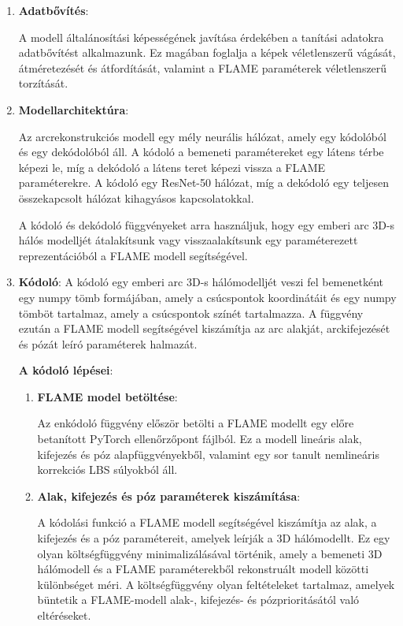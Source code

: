 \documentclass[12pt,a4]{article}
\begin{document}
    \begin{enumerate}
        \item \textbf{Adatbővítés}:
        
        A modell általánosítási képességének javítása érdekében a tanítási adatokra adatbővítést alkalmazunk. Ez magában foglalja a képek véletlenszerű vágását, átméretezését és átfordítását, valamint a FLAME paraméterek véletlenszerű torzítását.
        \item \textbf{Modellarchitektúra}:
        
        Az arcrekonstrukciós modell egy mély neurális hálózat,
       amely egy kódolóból és egy dekódolóból áll. 
        A kódoló a bemeneti paramétereket egy látens térbe képezi le, 
        míg a dekódoló a látens teret képezi vissza a FLAME paraméterekre. 
        A kódoló egy ResNet-50 hálózat, míg a dekódoló egy teljesen összekapcsolt hálózat kihagyásos kapcsolatokkal.
    
    A kódoló és dekódoló függvényeket arra használjuk, hogy egy emberi arc 3D-s hálós modelljét átalakítsunk vagy visszaalakítsunk egy paraméterezett reprezentációból a FLAME modell segítségével.
        
        \item \textbf{Kódoló}:
        A kódoló egy emberi arc 3D-s hálómodelljét veszi fel bemenetként egy numpy tömb formájában, amely a csúcspontok koordinátáit és egy numpy tömböt tartalmaz, amely a csúcspontok színét tartalmazza.
A függvény ezután a FLAME modell segítségével kiszámítja az arc alakját, arckifejezését és pózát leíró paraméterek halmazát.

        \textbf{A kódoló lépései}:
        \begin{enumerate}
            \item \textbf{FLAME model betöltése}:
            
            Az enkódoló függvény először betölti a FLAME modellt egy előre betanított PyTorch ellenőrzőpont fájlból. 
Ez a modell lineáris alak, kifejezés és póz alapfüggvényekből, valamint egy sor tanult nemlineáris korrekciós LBS súlyokból áll.

            \item \textbf{Alak, kifejezés és póz paraméterek kiszámítása}:
            
            A kódolási funkció a FLAME modell segítségével kiszámítja az alak, a kifejezés és a póz paramétereit, amelyek leírják a 3D hálómodellt. 
Ez egy olyan költségfüggvény minimalizálásával történik, amely a bemeneti 3D hálómodell és a FLAME paraméterekből rekonstruált modell közötti különbséget méri. 
A költségfüggvény olyan feltételeket tartalmaz, amelyek büntetik a FLAME-modell alak-, kifejezés- és pózprioritásától való eltéréseket.


\end{enumerate}
\end{enumerate}
\end{document}
